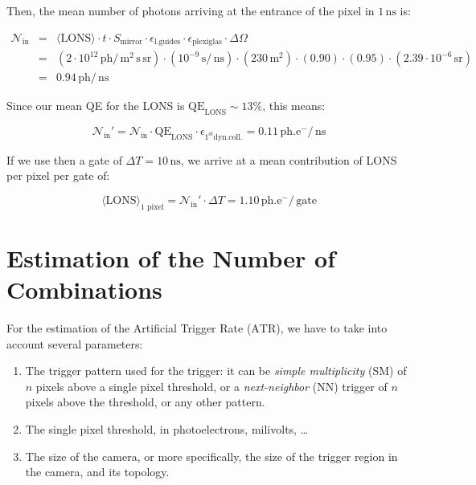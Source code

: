 \documentclass{article}
\def\phe{\u{ph.e^{-}}\xspace}
\def\ATR{\ensuremath{\mathrm{ATR}}\xspace}
\renewcommand{\u}[1]{\ensuremath{\,\mathrm{#1}}}  %
\begin{document}
Then, the mean number of photons arriving at the entrance of the pixel
in $1\u{ns}$ is:

\begin{eqnarray*}
\mathcal{N}_{\mathrm{in}} 
&=& \langle\mathrm{LONS}\rangle 
\cdot t 
\cdot S_{\text{mirror}}
\cdot \epsilon_{\text{l.guides}}
\cdot \epsilon_{\text{plexiglas}}
\cdot \Delta\Omega \\
&=& (2\cdot 10^{12} \u{ph}/\u{m}^2\u{s}\u{sr})
\cdot (10^{-9} \u{s}/\u{ns}) 
\cdot (230 \u{m}^2) 
\cdot (0.90) 
\cdot (0.95) 
\cdot (2.39\cdot 10^{-6} \u{sr})  \\
&=& 0.94 \u{ph}/\u{ns} 
\end{eqnarray*}

Since our mean QE for the LONS is $\mathrm{QE}_{\mathrm{LONS}} \sim
13\%$, this means:

\begin{equation*}
\mathcal{N}_{\mathrm{in}}' = \mathcal{N}_{\mathrm{in}} 
\cdot \mathrm{QE}_{\mathrm{LONS}} 
\cdot \epsilon_{1^{\mathrm{st}}\text{dyn.coll.}}
= 0.11 \phe/\u{ns}
\end{equation*}

If we use then a gate of $\Delta T=10\u{ns}$, we arrive at a mean
contribution of LONS per pixel per gate of:

\begin{equation*}
\langle\text{LONS}\rangle_{\text{1 pixel}} =
\mathcal{N}_{\mathrm{in}}' \cdot \Delta T = 1.10 \phe/\u{gate}
\end{equation*}

\section*{Estimation of the Number of Combinations}

For the estimation of the Artificial Trigger Rate (\ATR), we have to
take into account several parameters:

\begin{enumerate}

\item The trigger pattern used for the trigger: it can be \emph{simple
  multiplicity} (SM) of $n$ pixels above a single pixel threshold, or a
  \emph{next-neighbor} (NN) trigger of $n$ pixels above the threshold,
  or any other pattern.

\item The single pixel threshold, in photoelectrons, milivolts, 
  \ldots

\item The size of the camera, or more specifically, the size of the
  trigger region in the camera, and its topology.

\end{enumerate}
\end{document}
